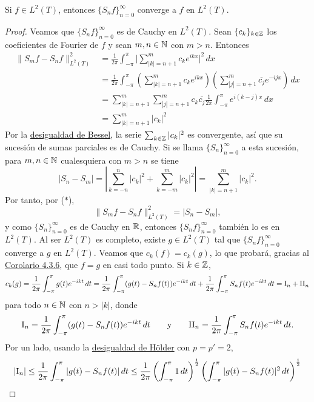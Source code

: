 \documentclass[a4paper, 11pt, oneside]{report}
\begin{document}
\begin{theorem}
  Si $f \in L^2(T)$, entonces $\{S_nf\}_{n=0}^\infty$ converge a $f$ en $L^2(T)$.
\end{theorem}

\begin{proof}
  Veamos que $\{S_nf\}_{n=0}^\infty$ es de Cauchy en $L^2(T)$. Sean $\{c_k\}_{k \in \mathbb Z}$ los coeficientes de Fourier de $f$ y sean $m,n \in \mathbb N$ con $m > n$. Entonces
  \begin{align*}
    \|S_mf-S_nf\|_{L^2(T)}^2 &= \frac{1}{2\pi}\int_{-\pi}^\pi\biggl|\sum_{|k|=n+1}^m c_ke^{ikx}\biggr|^2 \, dx \\
    &= \frac{1}{2\pi}\int_{-\pi}^\pi\left(\sum_{|k|=n+1}^m c_ke^{ikx}\right)\left(\sum_{|j|=n+1}^m \overline{c_j}e^{-ijx}\right) \, dx \\
    &=\sum_{|k|=n+1}^m \sum_{|j|=n+1}^m c_k\overline{c_j} \frac{1}{2\pi}\int_{-\pi}^\pi e^{i(k-j)x} \, dx \\
    &= \sum_{|k|=n+1}^m |c_k|^2 \tag{$\ast$}
  \end{align*}
  Por la \hyperref[teo:4.1.7]{\color{c1}desigualdad de Bessel}, la serie $\sum_{k \in \mathbb Z}|c_k|^2$ es convergente, así que su sucesión de sumas parciales es de Cauchy. Si se llama $\{S_n\}_{n=0}^\infty$ a esta sucesión, para $m,n\in\mathbb N$ cualesquiera con $m>n$ se tiene
  \[|S_n - S_m| = \left|\sum_{k=-n}^n |c_k|^2 + \sum_{k=-m}^m |c_k|^2\right| = \sum_{|k|=n+1}^m |c_k|^2.\]
  Por tanto, por ($\ast$),
  \[\|S_mf-S_nf\|_{L^2(T)}^2 = |S_n-S_m|,\]
  y como $\{S_n\}_{n=0}^\infty$ es de Cauchy en $\mathbb R$, entonces $\{S_nf\}_{n=0}^\infty$ también lo es en $L^2(T)$. Al ser $L^2(T)$ es completo, existe $g \in L^2(T)$ tal que $\{S_nf\}_{n=0}^\infty$ converge a $g$ en $L^2(T)$. Veamos que $c_k(f)=c_k(g)$, lo que probará, gracias al \hyperref[cor:4.3.6]{\color{c1}Corolario 4.3.6}, que $f = g$ en casi todo punto. Si $k \in \mathbb Z$,
  \[c_k(g) = \frac{1}{2\pi}\int_{-\pi}^\pi g(t) e^{-ikt} \, dt = \frac{1}{2\pi}\int_{-\pi}^\pi (g(t)-S_nf(t))e^{-ikt} \, dt + \frac{1}{2\pi}\int_{-\pi}^\pi S_nf(t)e^{-ikt} \, dt = \textup{I}_n+\textup{II}_n\]
  para todo $n \in \mathbb N$ con $n > |k|$, donde
  \[\textup{I}_n =\frac{1}{2\pi}\int_{-\pi}^\pi (g(t)-S_nf(t))e^{-ikt} \, dt \qquad \textup{y} \qquad \textup{II}_n = \frac{1}{2\pi}\int_{-\pi}^\pi S_nf(t)e^{-ikt} \, dt.\]
  Por un lado, usando la \hyperref[teo:1.2.6]{\color{c1}desigualdad de Hölder} con $p=p'=2$,
  \begin{align*}
    |\textup{I}_n| \leq \frac{1}{2\pi}\int_{-\pi}^\pi |g(t)-S_nf(t)| \, dt 
     \leq \frac{1}{2\pi}\left(\int_{-\pi}^\pi 1 \, dt\right)^{\frac{1}{2}} \left(\int_{-\pi}^\pi |g(t)-S_nf(t)|^2 \, dt\right)^{\frac{1}{2}} 

\end{align*}
\end{proof}
\end{document}
